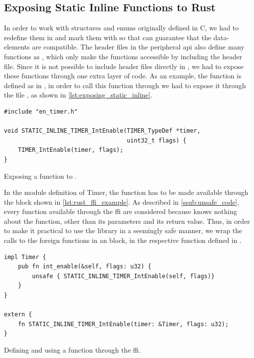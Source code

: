\subsection{Exposing Static Inline Functions to Rust}

In order to work with structures and enums originally defined in C, we had to redefine them in {\rust} and mark them with \attrib{\#[repr(C)]} so that {\rust} can guarantee that the data-elements are {\C} compatible.
The header files in the peripheral \gls{api} also define many functions as , which only make the functions accessible by including the header file.
Since it is not possible to include {\C} header files directly in {\rust}, we had to expose these functions through one extra layer of {\C} code.
As an example, the  function is defined as  in , in order to call this function through {\rust} we had to expose it through the file , as shown in \autoref{lst:exposing_static_inline}.

\begin{listing}[h]
\begin{verbatim}
#include "en_timer.h"

void STATIC_INLINE_TIMER_IntEnable(TIMER_TypeDef *timer,
                                   uint32_t flags) {
    TIMER_IntEnable(timer, flags);
}
\end{verbatim}
\caption{Exposing a  function to {\rust}.}
\label{lst:exposing_static_inline}
\end{listing}

In the {\rust} module definition of Timer, the function has to be made available through the  block shown in \autoref{lst:rust_ffi_example}.
As described in \autoref{ssub:unsafe_code}, every function available through the \gls{ffi} are considered {\unsafe} because {\rust} knows nothing about the function, other than its parameters and its return value.
Thus, in order to make it practical to use the library in a seemingly safe manner, we wrap the calls to the foreign functions in an {\unsafe} block, in the respective function defined in {\rust}.

\begin{listing}[h]
\begin{verbatim}
impl Timer {
    pub fn int_enable(&self, flags: u32) {
        unsafe { STATIC_INLINE_TIMER_IntEnable(self, flags)}
    }
}

extern {
    fn STATIC_INLINE_TIMER_IntEnable(timer: &Timer, flags: u32);
}
\end{verbatim}
\caption{Defining and using a function through the {\rust} \gls{ffi}.}
\label{lst:rust_ffi_example}
\end{listing}

